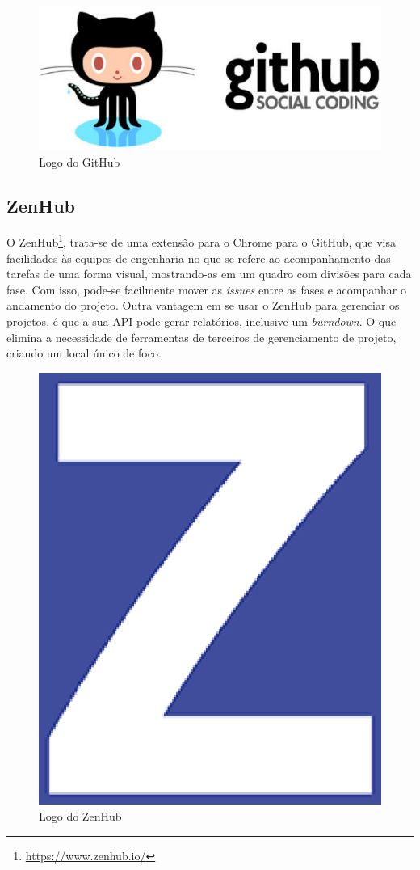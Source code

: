 \begin{figure}[!h]
	\centering
	\includegraphics[scale=0.35]{figuras/capitulo3/github.eps}
	\caption{Logo do GitHub}
	\label{github}
\end{figure}

\subsection{ZenHub}

O ZenHub\footnote{\url{https://www.zenhub.io/}}, trata-se de uma extensão para o Chrome para o GitHub, que visa facilidades às equipes de engenharia no que se refere ao acompanhamento das tarefas de uma forma visual, mostrando-as em um quadro com divisões para cada fase. Com isso, pode-se facilmente mover as \textit{issues} entre as fases e acompanhar o andamento do projeto. Outra vantagem em se usar o ZenHub para gerenciar os projetos, é que a sua API pode gerar relatórios, inclusive um \textit{burndown}. O que elimina a necessidade de ferramentas de terceiros de gerenciamento de projeto, criando um local único de foco.

\begin{figure}[!h]
	\centering
	\includegraphics[scale=0.3]{figuras/capitulo3/zenhub.eps}
	\caption{Logo do ZenHub}
	\label{zenhub}
\end{figure}

